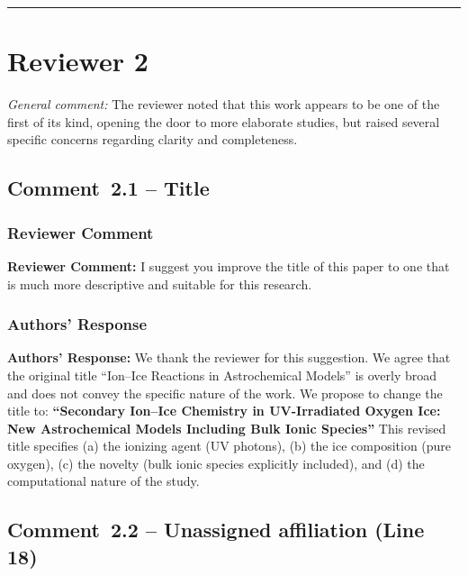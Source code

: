 \documentclass[12pt]{article}
\newcommand{\reviewlabel}{\textbf{\textcolor{commentframe}{Reviewer Comment:}}}
\newcommand{\responselabel}{\textbf{\textcolor{responseframe}{Authors' Response:}}}
\begin{document}
\bigskip
\hrule
\bigskip

\section{Reviewer 2}

\textit{General comment:} The reviewer noted that this work appears to be one
of the first of its kind, opening the door to more elaborate studies, but
raised several specific concerns regarding clarity and completeness.

\subsection{Comment~2.1 -- Title}

\subsubsection{Reviewer Comment}
\begin{reviewerbox}
\reviewlabel{} I suggest you improve the title of this paper to one that is
much more descriptive and suitable for this research.
\end{reviewerbox}

\subsubsection{Authors' Response}
\begin{responsebox}
\responselabel{} We thank the reviewer for this suggestion. We agree that the
original title ``Ion--Ice Reactions in Astrochemical Models'' is overly broad
and does not convey the specific nature of the work. We propose to change the
title to: \textbf{``Secondary Ion--Ice Chemistry in UV-Irradiated Oxygen Ice:
New Astrochemical Models Including Bulk Ionic Species''} This revised title
specifies (a) the ionizing agent (UV photons), (b) the ice composition (pure
oxygen), (c) the novelty (bulk ionic species explicitly included), and (d) the computational nature of the study.
\end{responsebox}

\subsection{Comment~2.2 -- Unassigned affiliation (Line 18)}
\end{document}
